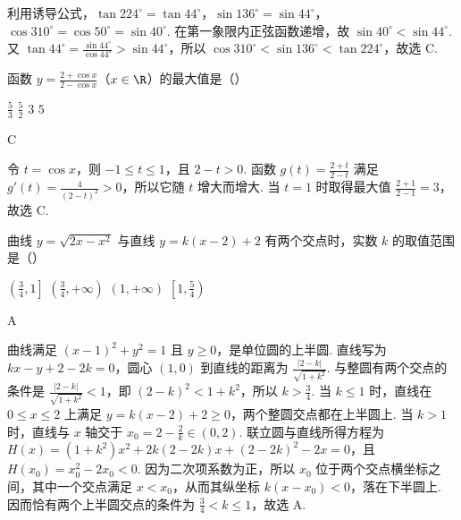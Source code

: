 \begin{solution}
利用诱导公式，\(\tan224^\circ=\tan44^\circ\)，\(\sin136^\circ=\sin44^\circ\)，\(\cos310^\circ=\cos50^\circ=\sin40^\circ\). 在第一象限内正弦函数递增，故 \(\sin40^\circ<\sin44^\circ\). 又 \(\tan44^\circ=\frac{\sin44^\circ}{\cos44^\circ}>\sin44^\circ\)，所以 \(\cos310^\circ<\sin136^\circ<\tan224^\circ\)，故选 C.
\end{solution}

\begin{problem}
函数 \(y = \frac{2 + \cos x}{2 - \cos x}\)（\(x \in \R\)）的最大值是（\quad）

\choices
    {\(\frac{5}{3}\)}
    {\(\frac{5}{2}\)}
    {\(3\)}
    {\(5\)}
\end{problem}

\begin{answer}
C
\end{answer}

\begin{solution}
令 \(t=\cos x\)，则 \(-1\leqslant t\leqslant1\)，且 \(2-t>0\). 函数 \(g(t)=\frac{2+t}{2-t}\) 满足 \(g'(t)=\frac4{(2-t)^2}>0\)，所以它随 \(t\) 增大而增大. 当 \(t=1\) 时取得最大值 \(\frac{2+1}{2-1}=3\)，故选 C.
\end{solution}

\begin{problem}
曲线 \(y = \sqrt{2x - x^2}\) 与直线 \(y = k(x - 2) + 2\) 有两个交点时，实数 \(k\) 的取值范围是（\quad）

\choices
    {\(\left(\frac{3}{4},1\right]\)}
    {\(\left(\frac{3}{4},+\infty\right)\)}
    {\((1,+\infty)\)}
    {\(\left[1,\frac{5}{4}\right)\)}
\end{problem}

\begin{answer}
A
\end{answer}

\begin{solution}
曲线满足 \((x-1)^2+y^2=1\) 且 \(y\geqslant0\)，是单位圆的上半圆. 直线写为 \(kx-y+2-2k=0\)，圆心 \((1,0)\) 到直线的距离为 \(\frac{|2-k|}{\sqrt{1+k^2}}\). 与整圆有两个交点的条件是 \(\frac{|2-k|}{\sqrt{1+k^2}}<1\)，即 \((2-k)^2<1+k^2\)，所以 \(k>\frac34\). 当 \(k\leqslant1\) 时，直线在 \(0\leqslant x\leqslant2\) 上满足 \(y=k(x-2)+2\geqslant0\)，两个整圆交点都在上半圆上. 当 \(k>1\) 时，直线与 \(x\) 轴交于 \(x_0=2-\frac2k\in(0,2)\). 联立圆与直线所得方程为 \(H(x)=(1+k^2)x^2+2k(2-2k)x+(2-2k)^2-2x=0\)，且 \(H(x_0)=x_0^2-2x_0<0\). 因为二次项系数为正，所以 \(x_0\) 位于两个交点横坐标之间，其中一个交点满足 \(x<x_0\)，从而其纵坐标 \(k(x-x_0)<0\)，落在下半圆上. 因而恰有两个上半圆交点的条件为 \(\frac34<k\leqslant1\)，故选 A.
\end{solution}

